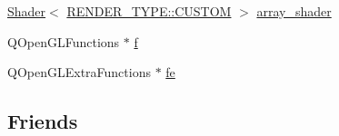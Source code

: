 \begin{DoxyCompactItemize}
\item 
\mbox{\hyperlink{classShader}{Shader}}$<$ \mbox{\hyperlink{shader__class_8hpp_a24e288e18eb7b6e01de7565001fedb60a72baef04098f035e8a320b03ad197818}{R\+E\+N\+D\+E\+R\+\_\+\+T\+Y\+P\+E\+::\+C\+U\+S\+T\+OM}} $>$ \mbox{\hyperlink{classSpinArray_a3878164b21186d502b07721b33d18c6c}{array\+\_\+shader}}
\item 
Q\+Open\+G\+L\+Functions $\ast$ \mbox{\hyperlink{classSpinArray_aac548e72694311f016d7b6fd0ba63be3}{f}}
\item 
Q\+Open\+G\+L\+Extra\+Functions $\ast$ \mbox{\hyperlink{classSpinArray_adf7cfad121711467cfc5544753d16213}{fe}}
\end{DoxyCompactItemize}
\subsection*{Friends}
